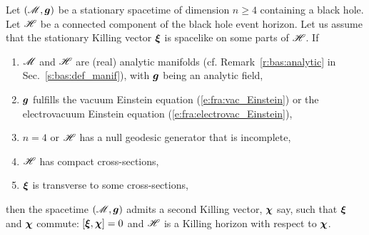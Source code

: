 \begin{prop}
\label{p:sta:strong_rigidity_thm}
Let $(\mathscr{M},\bm{g})$ be a stationary spacetime of dimension $n\geq 4$ containing a black
hole. Let $\mathscr{H}$ be a connected component of the black hole event horizon.
Let us assume that the stationary Killing vector $\bm{\xi}$
is spacelike on some parts of $\mathscr{H}$. If
\begin{enumerate}
\item $\mathscr{M}$ and $\mathscr{H}$ are (real) analytic manifolds
(cf. Remark~\ref{r:bas:analytic} in Sec.~\ref{s:bas:def_manif}),
with $\bm{g}$ being an analytic field,
\item $\bm{g}$ fulfills the vacuum Einstein equation (\ref{e:fra:vac_Einstein})
or the electrovacuum Einstein equation (\ref{e:fra:electrovac_Einstein}),
\item $n=4$ or $\mathscr{H}$ has a null geodesic generator that is incomplete,
\item $\mathscr{H}$ has compact cross-sections,
\item $\bm{\xi}$ is transverse to some cross-sections,
\end{enumerate}
then the spacetime $(\mathscr{M},\bm{g})$ admits a second Killing vector, $\bm{\chi}$
say, such that $\bm{\xi}$ and $\bm{\chi}$ commute: $[\bm{\xi}, \bm{\chi}] = 0$ and
$\mathscr{H}$ is a Killing horizon with respect to $\bm{\chi}$.
\end{prop}

